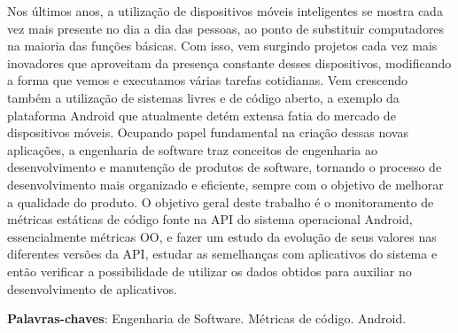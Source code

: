 \begin{resumo}

Nos últimos anos, a utilização de dispositivos móveis inteligentes se mostra cada vez mais presente no dia a dia das pessoas, ao ponto de substituir computadores na maioria das funções básicas. Com isso, vem surgindo projetos cada vez mais inovadores que aproveitam da presença constante desses dispositivos, modificando a forma que vemos e executamos várias tarefas cotidianas. Vem crescendo também a utilização de sistemas livres e de código aberto, a exemplo da plataforma Android que atualmente detém extensa fatia do mercado de dispositivos móveis. Ocupando papel fundamental na criação dessas novas aplicações, a engenharia de software traz conceitos de engenharia ao desenvolvimento e manutenção de produtos de software, tornando o processo de desenvolvimento mais organizado e eficiente, sempre com o objetivo de melhorar a qualidade do produto. O objetivo geral deste trabalho é o monitoramento de métricas estáticas de código fonte na API do sistema operacional Android, essencialmente métricas OO, e fazer um estudo da evolução de seus valores nas diferentes versões da API, estudar as semelhanças com aplicativos do sistema e então verificar a possibilidade de utilizar os dados obtidos para auxiliar no desenvolvimento de aplicativos.

\vspace{\onelineskip}
    
 \noindent
 \textbf{Palavras-chaves}: Engenharia de Software. Métricas de código. Android.

\end{resumo}
